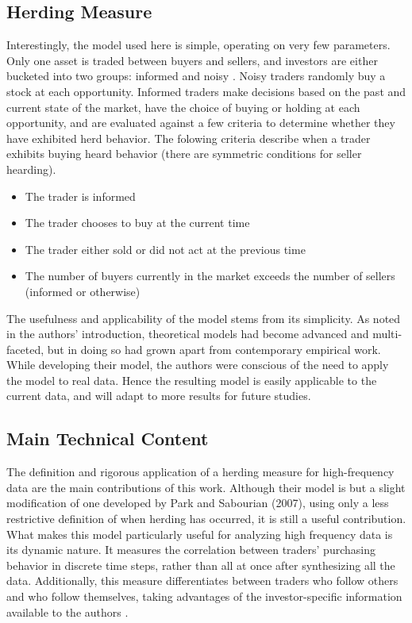 \documentclass{article}
\begin{document}
\subsection{Herding Measure}  
  Interestingly, the model used here is simple, operating on very few parameters. 
  Only one asset is traded between buyers and sellers, and investors are either bucketed into two groups: informed and noisy \cite[5]{boortz}.
  Noisy traders randomly buy a stock at each opportunity.
  Informed traders make decisions based on the past and current state of the market, have the choice of buying or holding at each opportunity, and are evaluated against a few criteria to determine whether they have exhibited herd behavior.
  The folowing criteria describe when a trader exhibits buying heard behavior (there are symmetric conditions for seller hearding).
  \begin{itemize}
  \item 
    The trader is informed
  \item
    The trader chooses to buy at the current time
  \item 
    The trader either sold or did not act at the previous time
  \item 
    The number of buyers currently in the market exceeds the number of sellers (informed or otherwise)
  \end{itemize}
  The usefulness and applicability of the model stems from its simplicity. 
  As noted in the authors' introduction, theoretical models had become advanced and multi-faceted, but in doing so had grown apart from contemporary empirical work.
  While developing their model, the authors were conscious of the need to apply the model to real data.
  Hence the resulting model is easily applicable to the current data, and will adapt to more results for future studies.

\subsection{Main Technical Content}  
  The definition and rigorous application of a herding measure for high-frequency data are the main contributions of this work.
  Although their model is but a slight modification of one developed by Park and Sabourian (2007), using only a less restrictive definition of when herding has occurred, it is still a useful contribution.
  What makes this model particularly useful for analyzing high frequency data is its dynamic nature.
  It measures the correlation between traders' purchasing behavior in discrete time steps, rather than all at once after synthesizing all the data.
  Additionally, this measure differentiates between traders who follow others and who follow themselves, taking advantages of the investor-specific information available to the authors \cite{boortz}. 
  
\end{document}
